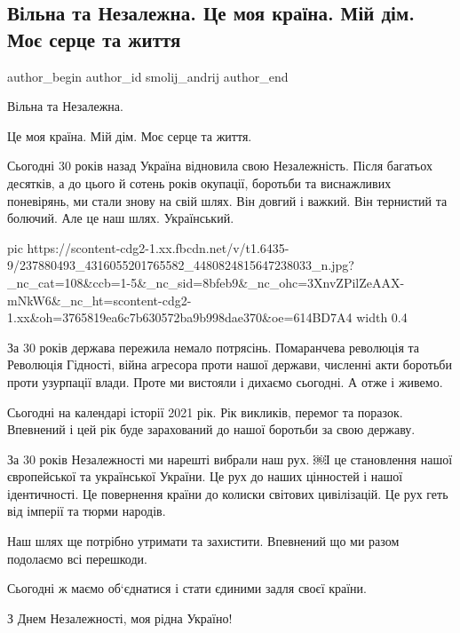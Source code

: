  
 
 
 
 
 
\subsection{Вільна та Незалежна. Це моя країна. Мій дім. Моє серце та життя}
\label{sec:24_08_2021.fb.smolij_andrij.1.nezalezhnist_pozdravlenie}
 
\ifcmt
 author_begin
   author_id smolij_andrij
 author_end
\fi

Вільна та Незалежна. 

Це моя країна. Мій дім. Моє серце та життя. 

Сьогодні 30 років назад Україна відновила свою Незалежність. Після багатьох
десятків, а до цього й сотень років окупації, боротьби та виснажливих
поневірянь, ми стали знову на свій шлях. Він довгий і важкий. Він тернистий та
болючий. Але це наш шлях. Український. 

\ifcmt
  pic https://scontent-cdg2-1.xx.fbcdn.net/v/t1.6435-9/237880493_4316055201765582_4480824815647238033_n.jpg?_nc_cat=108&ccb=1-5&_nc_sid=8bfeb9&_nc_ohc=3XnvZPilZeAAX-mNkW6&_nc_ht=scontent-cdg2-1.xx&oh=3765819ea6c7b630572ba9b998dae370&oe=614BD7A4
  width 0.4
\fi

За 30 років держава пережила немало потрясінь. Помаранчева революція та
Революція Гідності, війна агресора проти нашої держави, численні акти боротьби
проти узурпації влади. Проте ми вистояли і дихаємо сьогодні. А отже і живемо. 

Сьогодні на календарі історії 2021 рік. Рік викликів, перемог та поразок.
Впевнений і цей рік буде зарахований до нашої боротьби за свою державу. 

За 30 років Незалежності ми нарешті вибрали наш рух. ￼І це становлення нашої
європейської та української України. Це рух до наших цінностей і нашої
ідентичності. Це повернення країни до колиски світових цивілізацій. Це рух геть
від імперії та тюрми народів. 

Наш шлях ще потрібно утримати та захистити. Впевнений що ми разом подолаємо всі
перешкоди. 

Сьогодні ж маємо об‘єднатися і стати єдиними задля своєї країни. 

З Днем Незалежності, моя рідна Україно!
